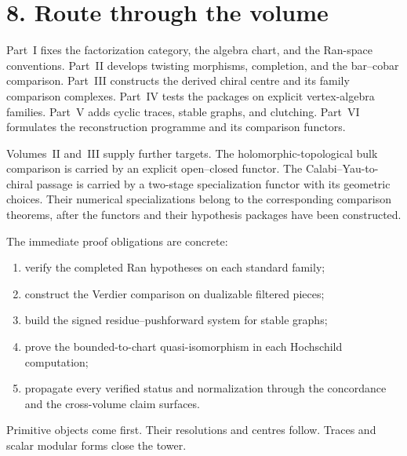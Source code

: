 \section*{8.  Route through the volume}

Part~I fixes the factorization category, the algebra chart, and the
Ran-space conventions.  Part~II develops twisting morphisms,
completion, and the bar--cobar comparison.  Part~III constructs the
derived chiral centre and its family comparison complexes.  Part~IV
tests the packages on explicit vertex-algebra families.  Part~V adds
cyclic traces, stable graphs, and clutching.  Part~VI formulates the
reconstruction programme and its comparison functors.

Volumes~II and~III supply further targets.  The holomorphic-topological
bulk comparison is carried by an explicit open--closed functor.  The
Calabi--Yau-to-chiral passage is carried by a two-stage specialization
functor with its geometric choices.  Their numerical specializations
belong to the corresponding comparison theorems, after the functors
and their hypothesis packages have been constructed.

The immediate proof obligations are concrete:
\begin{enumerate}[label=\textup{(\arabic*)},leftmargin=*]
\item verify the completed Ran hypotheses on each standard family;
\item construct the Verdier comparison on dualizable filtered pieces;
\item build the signed residue--pushforward system for stable graphs;
\item prove the bounded-to-chart quasi-isomorphism in each
Hochschild computation;
\item propagate every verified status and normalization through the
concordance and the cross-volume claim surfaces.
\end{enumerate}

Primitive objects come first.  Their resolutions and centres follow.
Traces and scalar modular forms close the tower.
